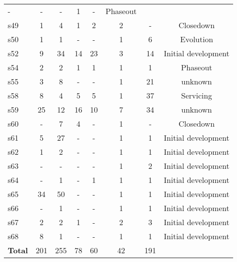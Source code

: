 \begin{longtable}{| l | c c | c c c | c | c |}
  - &
  - &
  - &
  1 &
  - &
  Phaseout \\
s49 &
  1 &
  4 &
  1 &
  2 &
  2 &
  - &
  Closedown \\
s50 &
  1 &
  1 &
  - &
  - &
  1 &
  6 &
  Evolution \\
s52 &
  9 &
  34 &
  14 &
  23 &
  3 &
  14 &
  Initial development \\
s54 &
  2 &
  2 &
  1 &
  1 &
  1 &
  1 &
  Phaseout \\
s55 &
  3 &
  8 &
  - &
  - &
  1 &
  21 &
  unknown \\
s58 &
  8 &
  4 &
  5 &
  5 &
  1 &
  37 &
  Servicing \\
s59 &
  25 &
  12 &
  16 &
  10 &
  7 &
  34 &
  unknown \\
s60 &
  - &
  7 &
  4 &
  - &
  1 &
  - &
  Closedown \\
s61 &
  5 &
  27 &
  - &
  - &
  1 &
  1 &
  Initial development \\
s62 &
  1 &
  2 &
  - &
  - &
  1 &
  1 &
  Initial development \\
s63 &
  - &
  - &
  - &
  - &
  1 &
  2 &
  Initial development \\
s64 &
  - &
  1 &
  - &
  1 &
  1 &
  1 &
  Initial development \\
s65 &
  34 &
  50 &
  - &
  - &
  1 &
  1 &
  Initial development \\
s66 &
  - &
  1 &
  - &
  - &
  1 &
  1 &
  Initial development \\
s67 &
  2 &
  2 &
  1 &
  - &
  2 &
  3 &
  Initial development \\
s68 &
  8 &
  1 &
  - &
  - &
  1 &
  1 &
  Initial development \\
  \hline
{\bf Total} &
  201 &
  255 &
  78 &
  60 &
  42 &
  191 &
     \\
  \hline
\end{longtable}
